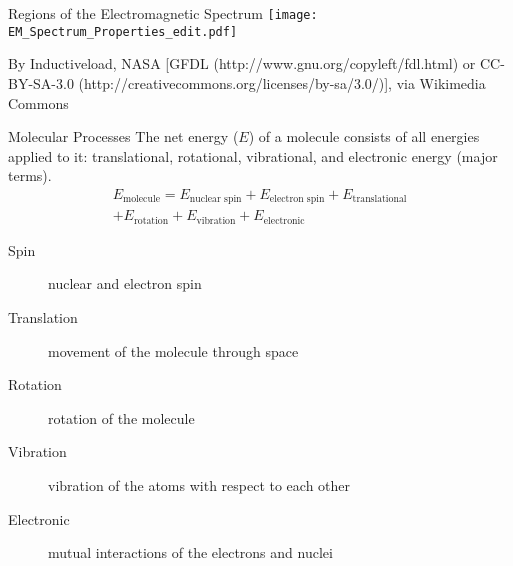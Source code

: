 \documentclass[notes=only]{beamer}
\begin{document}
\begin{frame}{Regions of the Electromagnetic Spectrum}
	\texttt{[image: EM\_Spectrum\_Properties\_edit.pdf]}

	\footnotesize{By Inductiveload, NASA [GFDL
	(http://www.gnu.org/copyleft/fdl.html) or CC-BY-SA-3.0
	(http://creativecommons.org/licenses/by-sa/3.0/)], via Wikimedia
	Commons}
\end{frame}

\begin{frame}[allowframebreaks]{Molecular Processes}
	The net energy ($E$) of a molecule consists of all energies applied to
	it: \alert{translational}, \alert{rotational}, \alert{vibrational}, and
	\alert{electronic energy} (major terms).
	\begin{multline*}
		E_\text{molecule} = E_\text{nuclear spin} + E_\text{electron
		spin} + E_\text{translational} \\ + E_\text{rotation} +
		E_\text{vibration} + E_\text{electronic}
	\end{multline*}

	\begin{description}
		\item[Spin       ] nuclear and electron spin
		\item[Translation] movement of the molecule through space
		\item[Rotation   ] rotation of the molecule
		\item[Vibration  ] vibration of the atoms with respect to each other
		\item[Electronic ] mutual interactions of the electrons and nuclei
\end{description}

\framebreak

\end{frame}
\end{document}
